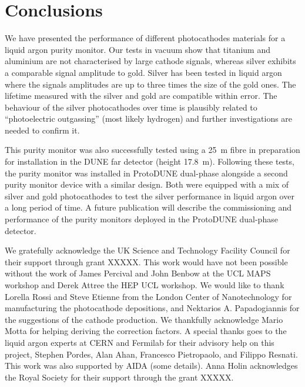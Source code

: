 \documentclass[a4paper,11pt]{article}
\begin{document}

\section{Conclusions}
We have presented the performance of different photocathodes materials for a liquid argon purity monitor.
Our tests in vacuum show that titanium and aluminium are not characterised by large cathode signals, whereas silver exhibits a comparable signal amplitude to gold.
Silver has been tested in liquid argon where the signals amplitudes are up to three times the size of the gold ones. The lifetime measured with the silver and gold are compatible within error.
The behaviour of the silver photocathodes over time is plausibly related to ``photoelectric outgassing'' (most likely hydrogen) and further investigations are needed to confirm it.

This purity monitor was also successfully tested using a \SI{25}{m} fibre in preparation for installation in the DUNE far detector (height \SI{17.8}{m}). 
Following these tests, the purity monitor was installed in ProtoDUNE dual-phase alongside a second purity monitor device with a similar design. Both were equipped with a mix of silver and gold photocathodes to test the silver performance in liquid argon over a long period of time.
A future publication will describe the commissioning and performance of the purity monitors deployed in the ProtoDUNE dual-phase detector.

\acknowledgments
We gratefully acknowledge the UK Science and Technology Facility Council for their support through grant XXXXX.
This work would have not been possible without the work of James Percival and John Benbow at the UCL MAPS workshop and Derek Attree the HEP UCL workshop. We would like to thank Lorella Rossi and Steve Etienne from the London Center of Nanotechnology for manufacturing the photocathode depositions, and Nektarios A. Papadogiannis for the suggestions of the cathode production.
We thankfully acknowledge Mario Motta for helping deriving the correction factors. 
A special thanks goes to the liquid argon experts at CERN and Fermilab for their advisory help on this project, Stephen Pordes, Alan Ahan, Francesco Pietropaolo, and Filippo Resnati.
This work was also supported by AIDA (some details).
Anna Holin acknowledges the Royal Society for their support through the grant XXXXX.
\end{document}
